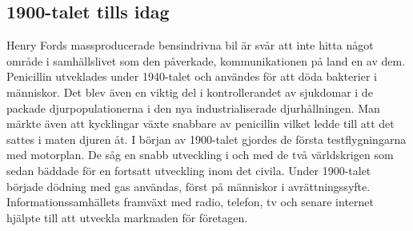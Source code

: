 \subsection{1900-talet tills idag}
Henry Fords massproducerade bensindrivna bil är svår att inte hitta något område i samhällslivet som den påverkade, kommunikationen på land en av dem. \citep{denskapande}
\newline
\newline
Penicillin utveklades under 1940-talet och användes för att döda bakterier i människor. Det blev även en viktig del i kontrollerandet av sjukdomar i de packade djurpopulationerna i den nya industrialiserade djurhållningen. Man märkte även att kycklingar växte snabbare av penicillin vilket ledde till att det sattes i maten djuren åt. \citep{denskapande}
\newline
\newline
I början av 1900-talet gjordes de första testflygningarna med motorplan. De såg en snabb utveckling i och med de två världskrigen som sedan bäddade för en fortsatt utveckling inom det civila. \citep{denskapande}
\newline
\newline
Under 1900-talet började dödning med gas användas, först på människor i avrättningssyfte. \citep{denskapande}
\newline
\newline
Informationssamhällets framväxt med radio, telefon, tv och senare internet hjälpte till att utveckla marknaden för företagen. \citep{kommunikation}